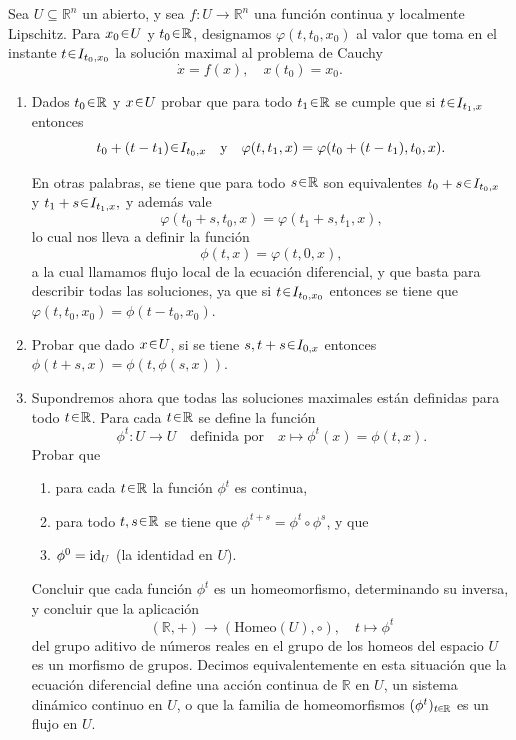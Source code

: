 \begin{ejer}
Sea $U \subseteq \mathbb{R}^n$ un abierto, y sea 
$f \colon U \to \mathbb{R}^n$ una función continua y localmente Lipschitz. 
Para $x_0 \en U$ y $t_0 \en \mathbb{R}$, designamos $\varphi(t, t_0, x_0)$ al valor que 
toma en el instante $t \en I_{t_0,x_0}$ la solución maximal al problema de Cauchy
\[
\dot{x} = f(x), \quad x(t_0) = x_0.
\]

\begin{enumerate}[label = (\alph*)]
\item Dados $t_0 \en \mathbb{R}$ y $x \en U$ probar que para todo 
$t_1 \en \mathbb{R}$ se cumple que si $t \en I_{t_1,x}$ entonces
\[
t_0 + (t - t_1) \en I_{t_0,x} \quad \text{y} \quad 
\varphi(t, t_1, x) = \varphi(t_0 + (t - t_1), t_0, x).
\]

En otras palabras, se tiene que para todo $s \en \mathbb{R}$ son equivalentes
\(
t_0 + s \en I_{t_0,x}\) y \(t_1 + s \en I_{t_1,x},
\)
y además vale
\[
\varphi(t_0 + s, t_0, x) = \varphi(t_1 + s, t_1, x),
\]
lo cual nos lleva a definir la función
\[
\phi(t, x) = \varphi(t, 0, x),
\]
a la cual llamamos flujo local de la ecuación diferencial, y que basta
para describir todas las soluciones, ya que si $t \en I_{t_0,x_0}$ entonces se
tiene que $\varphi(t, t_0, x_0) = \phi(t - t_0, x_0)$.

\item Probar que dado $x \en U$, si se tiene \(s, t+s \en I_{0,x}\) entonces $\phi(t+s, x) = \phi(t, \phi(s, x))$.

\item Supondremos ahora que todas las soluciones maximales están definidas
para todo $t \en \mathbb{R}$. Para cada $t \en \mathbb{R}$ se define la función
\[
\phi^t \colon U \to U \quad\text{definida por}\quad x \mapsto \phi^t(x) = \phi(t, x).
\]
Probar que
\begin{enumerate}[label = (\roman*)]
\item para cada $t \en \mathbb{R}$ la función $\phi^t$ es continua,
\item para todo $t, s \en \mathbb{R}$ se tiene que $\phi^{t+s} = \phi^t \circ \phi^s$, y que
\item $\phi^0 = \operatorname{id}_U$ (la identidad en $U$).
\end{enumerate}

Concluir que cada función $\phi^t$ es un homeomorfismo, determinando
su inversa, y concluir que la aplicación
\[
(\mathbb{R},+) \to (\mathrm{Homeo}(U), \circ), \quad
t \mapsto \phi^t
\]
del grupo aditivo de números reales en el grupo de los homeos del
espacio $U$ es un morfismo de grupos. Decimos equivalentemente
en esta situación que la ecuación diferencial define una acción
continua de $\mathbb{R}$ en $U$, un sistema dinámico continuo en $U$, 
o que la familia de homeomorfismos $(\phi^t)_{t \en \mathbb{R}}$ es un flujo en $U$.
\end{enumerate}
\end{ejer}\clearpage
